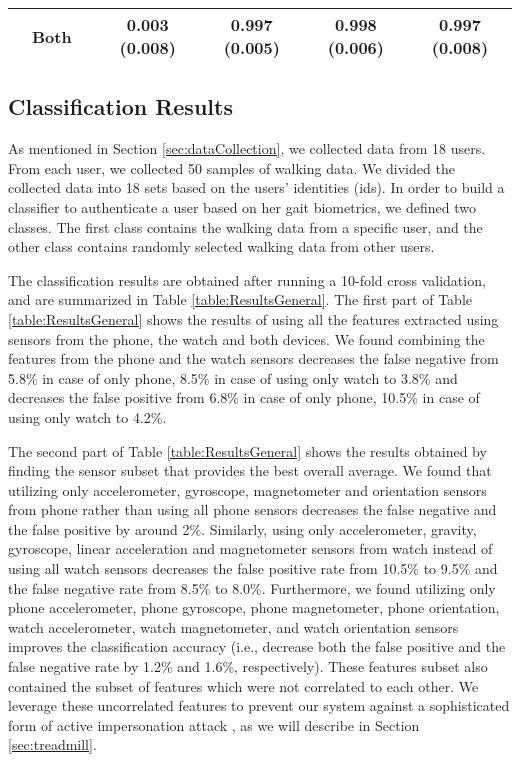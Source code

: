 \begin{table}[t]
\begin{tabular}{ll|c|c||c|c|c|}
\multicolumn{1}{|l|}{}                                     & \textbf{Both}       & \cellcolor[HTML]{C0C0C0}{0.002 (0.006) }  & \cellcolor[HTML]{C0C0C0} {0.003 (0.008) }  & \cellcolor[HTML]{C0C0C0} 0.997 (0.005)      & \cellcolor[HTML]{C0C0C0} 0.998 (0.006)   & \cellcolor[HTML]{C0C0C0} 0.997 (0.008)       \\ \hline
\end{tabular}
\vspace{-4mm}
\end{table}



\vspace{-3mm}
\subsection{Classification Results}

As mentioned in Section \ref{sec:dataCollection}, we collected data from 18
users. From each user, we collected 50 samples of walking data. We divided the collected data
into 18 sets based on the users' identities (ids).  In order to build a classifier to
authenticate a user based on her gait biometrics, we defined two classes.
The first class contains the walking data from a specific user, and the other class
contains randomly selected walking data from other users.   

The classification results are obtained after running a 10-fold cross validation, and are summarized in Table
\ref{table:ResultsGeneral}. 
The first part of Table \ref{table:ResultsGeneral} shows the results of using all the features 
extracted using sensors from the phone, the watch and both devices. 
We found combining the features from the phone and the watch sensors decreases the false 
negative from 5.8\% in case of only phone, 8.5\% in case of using only watch to 3.8\% and decreases 
the false positive from 6.8\% in case of only phone, 10.5\% in case of using only watch to 4.2\%.

The second part of Table \ref{table:ResultsGeneral} shows the results obtained by finding the 
sensor subset that provides the best overall average. We found that utilizing only  
accelerometer, gyroscope, magnetometer and orientation sensors from phone rather than using 
all phone sensors decreases the false negative and the false positive by around 2\%.
Similarly, using only  accelerometer, gravity, gyroscope, linear acceleration and magnetometer 
sensors from watch instead of using all watch sensors decreases the false positive rate from 
10.5\% to 9.5\% and the false negative rate from 8.5\% to 8.0\%.
Furthermore, we found utilizing only phone accelerometer, phone gyroscope, phone magnetometer, 
phone orientation, watch accelerometer, watch magnetometer, and watch orientation sensors 
improves the classification accuracy (i.e., decrease both the false positive and the false 
negative rate by 1.2\% and 1.6\%, respectively).
These features subset also contained the subset of features which were not correlated to each other. 
We leverage these uncorrelated features to prevent our \wuzia system against a sophisticated 
form of active impersonation attack \cite{kumar2015treadmill}, as we will describe in Section \ref{sec:treadmill}.

